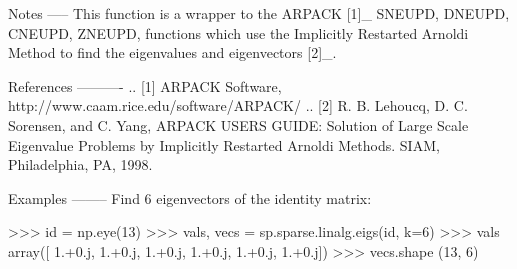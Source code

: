 \begin{DoxyVerb}
Notes
-----
This function is a wrapper to the ARPACK [1]_ SNEUPD, DNEUPD, CNEUPD,
ZNEUPD, functions which use the Implicitly Restarted Arnoldi Method to
find the eigenvalues and eigenvectors [2]_.

References
----------
.. [1] ARPACK Software, http://www.caam.rice.edu/software/ARPACK/
.. [2] R. B. Lehoucq, D. C. Sorensen, and C. Yang,  ARPACK USERS GUIDE:
   Solution of Large Scale Eigenvalue Problems by Implicitly Restarted
   Arnoldi Methods. SIAM, Philadelphia, PA, 1998.

Examples
--------
Find 6 eigenvectors of the identity matrix:

>>> id = np.eye(13)
>>> vals, vecs = sp.sparse.linalg.eigs(id, k=6)
>>> vals
array([ 1.+0.j,  1.+0.j,  1.+0.j,  1.+0.j,  1.+0.j,  1.+0.j])
>>> vecs.shape
(13, 6)\end{DoxyVerb}
 \hypertarget{namespacescipy_1_1sparse_1_1linalg_1_1eigen_1_1arpack_1_1arpack_ada30d9d4dc4c6d396150fdc8f5ff2f47}{}
